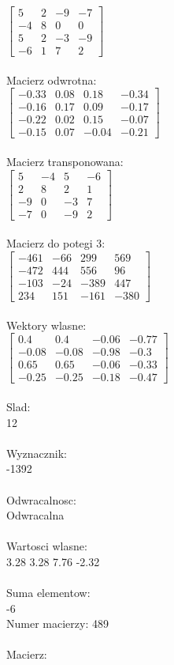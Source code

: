 \documentclass[a4paper,12pt]{article}
\begin{document}
$\begin{bmatrix} 5&2&-9&-7\\-4&8&0&0\\5&2&-3&-9\\-6&1&7&2 \end{bmatrix}$
\\
\\
Macierz odwrotna:\\

$\begin{bmatrix} -0.33&0.08&0.18&-0.34\\-0.16&0.17&0.09&-0.17\\-0.22&0.02&0.15&-0.07\\-0.15&0.07&-0.04&-0.21 \end{bmatrix}$
\\
\\
Macierz transponowana:\\

$\begin{bmatrix} 5&-4&5&-6\\2&8&2&1\\-9&0&-3&7\\-7&0&-9&2 \end{bmatrix}$
\\
\\
Macierz do potegi 3:\\

$\begin{bmatrix} -461&-66&299&569\\-472&444&556&96\\-103&-24&-389&447\\234&151&-161&-380 \end{bmatrix}$
\\
\\
Wektory wlasne:\\

$\begin{bmatrix} 0.4&0.4&-0.06&-0.77\\-0.08&-0.08&-0.98&-0.3\\0.65&0.65&-0.06&-0.33\\-0.25&-0.25&-0.18&-0.47 \end{bmatrix}$
\\
\\
Slad:\\
12
\\
\\
Wyznacznik:\\
-1392
\\
\\
Odwracalnosc:\\
Odwracalna
\\
\\
Wartosci wlasne:\\
3.28 3.28 7.76 -2.32
\\
\\
Suma elementow:\\
-6
\\
\newpage
Numer macierzy:
489
\\
\\
Macierz:\\
\end{document}
